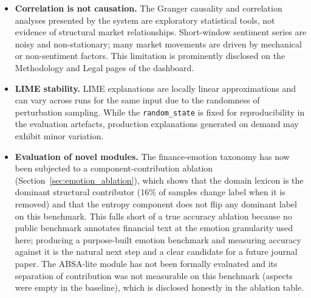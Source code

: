 \begin{itemize}
    \item \textbf{Correlation is not causation.}  The Granger causality and correlation analyses presented by the system are exploratory statistical tools, not evidence of structural market relationships.  Short-window sentiment series are noisy and non-stationary; many market movements are driven by mechanical or non-sentiment factors.  This limitation is prominently disclosed on the Methodology and Legal pages of the dashboard.

    \item \textbf{LIME stability.}  LIME explanations are locally linear approximations and can vary across runs for the same input due to the randomness of perturbation sampling.  While the \texttt{random\_state} is fixed for reproducibility in the evaluation artefacts, production explanations generated on demand may exhibit minor variation.

    \item \textbf{Evaluation of novel modules.}  The finance-emotion taxonomy has now been subjected to a component-contribution ablation (Section~\ref{sec:emotion_ablation}), which shows that the domain lexicon is the dominant structural contributor (16\% of samples change label when it is removed) and that the entropy component does not flip any dominant label on this benchmark.  This falls short of a true accuracy ablation because no public benchmark annotates financial text at the emotion granularity used here; producing a purpose-built emotion benchmark and measuring accuracy against it is the natural next step and a clear candidate for a future journal paper.  The ABSA-lite module has not been formally evaluated and its separation of contribution was not measurable on this benchmark (aspects were empty in the baseline), which is disclosed honestly in the ablation table.
\end{itemize}
